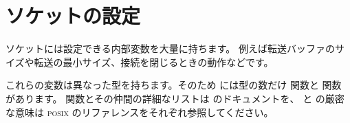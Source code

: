 \section {ソケットの設定}

ソケットには設定できる内部変数を大量に持ちます。
例えば転送バッファのサイズや転送の最小サイズ、接続を閉じるときの動作などです。

これらの変数は異なった型を持ちます。そのため \ocaml には型の数だけ
 関数と  関数
があります。
 関数とその仲間の詳細なリストは \ocaml のドキュメントを、
 と  の厳密な意味は
\textsc{posix} のリファレンスをそれぞれ参照してください。

